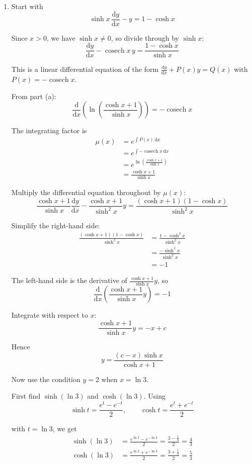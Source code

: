 \documentclass[leqno]{article}
\begin{document}
\begin{enumerate}[
  label=\textbf{\arabic*.},
  leftmargin=*,
  topsep=0pt,
  partopsep=0pt,
  parsep=0pt
]
\begin{djsSolution}
\begin{enumerate}[label=\textbf{(\alph*)}]
  \item Start with
\[
\sinh x\,\frac{\mathrm{d}y}{\mathrm{d}x}-y=1-\cosh x
\]

Since $x>0$, we have $\sinh x\neq 0$, so divide through by $\sinh x$:
\[
\frac{\mathrm{d}y}{\mathrm{d}x}-\operatorname{cosech}x\,y=\frac{1-\cosh x}{\sinh x}
\]

This is a linear differential equation of the form \(\frac{\mathrm{d}y}{\mathrm{d}x}+P(x)y=Q(x)\) with \(P(x)=-\operatorname{cosech}x\).

From part (a):
\[
\frac{\mathrm{d}}{\mathrm{d}x}\left(\ln\left(\frac{\cosh x+1}{\sinh x}\right)\right)=-\operatorname{cosech}x
\]

The integrating factor is
\begin{align*}
\mu(x)&=e^{\int P(x)\,\mathrm{d}x} \\
&=e^{\int -\operatorname{cosech}x\,\mathrm{d}x} \\
&=e^{\ln\left(\frac{\cosh x+1}{\sinh x}\right)} \\
&=\frac{\cosh x+1}{\sinh x}
\end{align*}

Multiply the differential equation throughout by $\mu(x)$:
\[
\frac{\cosh x+1}{\sinh x}\frac{\mathrm{d}y}{\mathrm{d}x}-\frac{\cosh x+1}{\sinh^2 x}y
=\frac{(\cosh x+1)(1-\cosh x)}{\sinh^2 x}
\]

Simplify the right-hand side:
\begin{align*}
\frac{(\cosh x+1)(1-\cosh x)}{\sinh^2 x}
&=\frac{1-\cosh^2 x}{\sinh^2 x} \\
&=\frac{-\sinh^2 x}{\sinh^2 x} \\
&=-1
\end{align*}

The left-hand side is the derivative of $\frac{\cosh x+1}{\sinh x}y$, so
\[
\frac{\mathrm{d}}{\mathrm{d}x}\left(\frac{\cosh x+1}{\sinh x}y\right)=-1
\]

Integrate with respect to $x$:
\[
\frac{\cosh x+1}{\sinh x}y=-x+c
\]

Hence
\[
y=\frac{(c-x)\sinh x}{\cosh x+1}
\]

Now use the condition $y=2$ when $x=\ln 3$.

First find $\sinh(\ln 3)$ and $\cosh(\ln 3)$. Using
\[
\sinh t=\frac{e^t-e^{-t}}{2},\qquad \cosh t=\frac{e^t+e^{-t}}{2}
\]

with $t=\ln 3$, we get
\begin{align*}
\sinh(\ln 3)&=\frac{e^{\ln 3}-e^{-\ln 3}}{2}=\frac{3-\frac13}{2}=\frac{4}{3} \\
\cosh(\ln 3)&=\frac{e^{\ln 3}+e^{-\ln 3}}{2}=\frac{3+\frac13}{2}=\frac{5}{3}
\end{align*}


\end{enumerate}
\end{djsSolution}
\end{enumerate}
\end{document}
